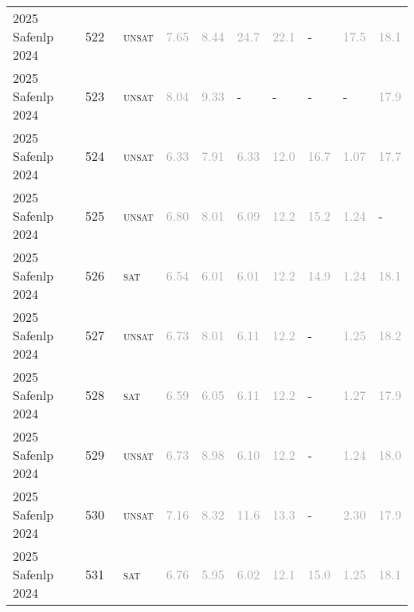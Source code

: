 \begin{center}
{\begin{longtable}{@{}llllllllll@{}}
2025 Safenlp 2024 & 522 & ~\textsc{unsat} & \textcolor{darkgray}{7.65} & \textcolor{darkgray}{8.44} & \textcolor{darkgray}{24.7} & \textcolor{darkgray}{22.1} & - & \textcolor{darkgray}{17.5} & \textcolor{darkgray}{18.1} \\
2025 Safenlp 2024 & 523 & ~\textsc{unsat} & \textcolor{darkgray}{8.04} & \textcolor{darkgray}{9.33} & - & - & - & - & \textcolor{darkgray}{17.9} \\
2025 Safenlp 2024 & 524 & ~\textsc{unsat} & \textcolor{darkgray}{6.33} & \textcolor{darkgray}{7.91} & \textcolor{darkgray}{6.33} & \textcolor{darkgray}{12.0} & \textcolor{darkgray}{16.7} & \textcolor{darkgray}{1.07} & \textcolor{darkgray}{17.7} \\
2025 Safenlp 2024 & 525 & ~\textsc{unsat} & \textcolor{darkgray}{6.80} & \textcolor{darkgray}{8.01} & \textcolor{darkgray}{6.09} & \textcolor{darkgray}{12.2} & \textcolor{darkgray}{15.2} & \textcolor{darkgray}{1.24} & - \\
2025 Safenlp 2024 & 526 & ~\textsc{sat} & \textcolor{darkgray}{6.54} & \textcolor{darkgray}{6.01} & \textcolor{darkgray}{6.01} & \textcolor{darkgray}{12.2} & \textcolor{darkgray}{14.9} & \textcolor{darkgray}{1.24} & \textcolor{darkgray}{18.1} \\
2025 Safenlp 2024 & 527 & ~\textsc{unsat} & \textcolor{darkgray}{6.73} & \textcolor{darkgray}{8.01} & \textcolor{darkgray}{6.11} & \textcolor{darkgray}{12.2} & - & \textcolor{darkgray}{1.25} & \textcolor{darkgray}{18.2} \\
2025 Safenlp 2024 & 528 & ~\textsc{sat} & \textcolor{darkgray}{6.59} & \textcolor{darkgray}{6.05} & \textcolor{darkgray}{6.11} & \textcolor{darkgray}{12.2} & - & \textcolor{darkgray}{1.27} & \textcolor{darkgray}{17.9} \\
2025 Safenlp 2024 & 529 & ~\textsc{unsat} & \textcolor{darkgray}{6.73} & \textcolor{darkgray}{8.98} & \textcolor{darkgray}{6.10} & \textcolor{darkgray}{12.2} & - & \textcolor{darkgray}{1.24} & \textcolor{darkgray}{18.0} \\
2025 Safenlp 2024 & 530 & ~\textsc{unsat} & \textcolor{darkgray}{7.16} & \textcolor{darkgray}{8.32} & \textcolor{darkgray}{11.6} & \textcolor{darkgray}{13.3} & - & \textcolor{darkgray}{2.30} & \textcolor{darkgray}{17.9} \\
2025 Safenlp 2024 & 531 & ~\textsc{sat} & \textcolor{darkgray}{6.76} & \textcolor{darkgray}{5.95} & \textcolor{darkgray}{6.02} & \textcolor{darkgray}{12.1} & \textcolor{darkgray}{15.0} & \textcolor{darkgray}{1.25} & \textcolor{darkgray}{18.1} \\

\end{longtable}}
\end{center}
